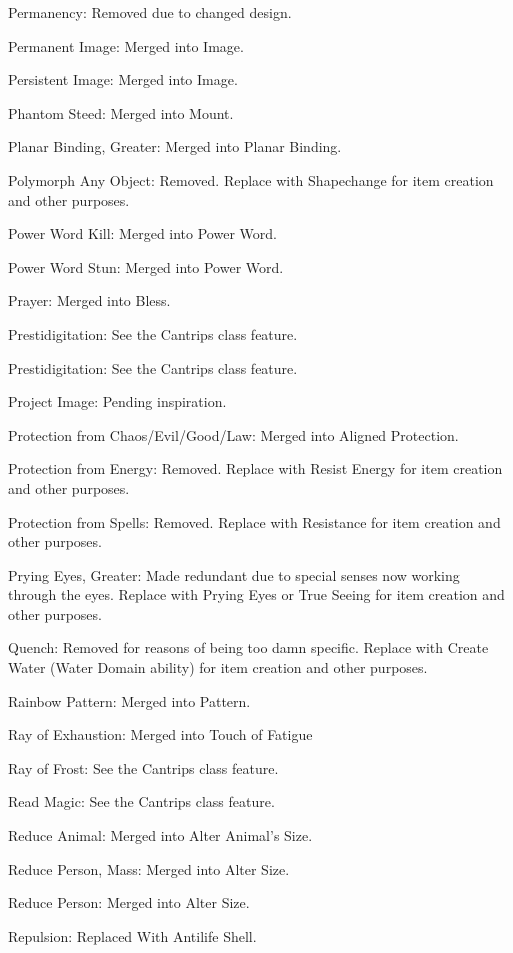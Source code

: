 {\begin{list}{}{\leftmargin=1em}
 \item Permanency: Removed due to changed design.
 \item Permanent Image: Merged into Image.
 \item Persistent Image: Merged into Image.
 \item Phantom Steed: Merged into Mount.
 \item Planar Binding, Greater: Merged into Planar Binding.
 \item Polymorph Any Object: Removed. Replace with Shapechange for item creation and other purposes.
 \item Power Word Kill: Merged into Power Word.
 \item Power Word Stun: Merged into Power Word.
 \item Prayer: Merged into Bless.
 \item Prestidigitation: See the Cantrips class feature.
 \item Prestidigitation: See the Cantrips class feature.
 \item Project Image: Pending inspiration.
 \item Protection from Chaos/Evil/Good/Law: Merged into Aligned Protection.
 \item Protection from Energy: Removed. Replace with Resist Energy for item creation and other purposes.
 \item Protection from Spells: Removed. Replace with Resistance for item creation and other purposes.
 \item Prying Eyes, Greater: Made redundant due to special senses now working through the eyes. Replace with Prying Eyes or True Seeing for item creation and other purposes.
 \item Quench: Removed for reasons of being too damn specific. Replace with Create Water (Water Domain ability) for item creation and other purposes.
 \item Rainbow Pattern: Merged into Pattern.
 \item Ray of Exhaustion: Merged into Touch of Fatigue
 \item Ray of Frost: See the Cantrips class feature.
 \item Read Magic: See the Cantrips class feature.
 \item Reduce Animal: Merged into Alter Animal's Size.
 \item Reduce Person, Mass: Merged into Alter Size.
 \item Reduce Person: Merged into Alter Size.
 \item Repulsion: Replaced With Antilife Shell.

\end{list}}
